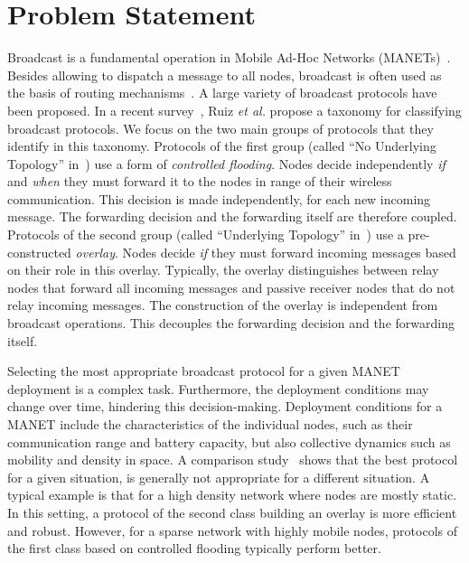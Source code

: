 
\section{Problem Statement}

Broadcast is a fundamental operation in Mobile Ad-Hoc Networks (MANETs)~\cite{SurveyRuiz}.
%
Besides allowing to dispatch a message to all nodes, broadcast is often used as the basis of routing mechanisms~\cite{survey_routing}.
%
A large variety of broadcast protocols have been proposed.
%
In a recent survey~\cite{SurveyRuiz}, Ruiz \emph{et al.} propose a taxonomy for classifying broadcast protocols.
%
We focus on the two main groups of protocols that they identify in this taxonomy.
%
Protocols of the first group (called ``No Underlying Topology'' in~\cite{SurveyRuiz}) use a form of \emph{controlled flooding}.
Nodes decide independently \emph{if} and \emph{when} they must forward it to the nodes in range of their wireless communication.
This decision is made independently, for each new incoming message.
The forwarding decision and the forwarding itself are therefore coupled.
%
Protocols of the second group (called ``Underlying Topology'' in~\cite{SurveyRuiz}) use a pre-constructed \emph{overlay}.
Nodes decide \emph{if} they must forward incoming messages based on their role in this overlay.
Typically, the overlay distinguishes between relay nodes that forward all incoming messages and passive receiver nodes that do not relay incoming messages.
The construction of the overlay is independent from broadcast operations.
This decouples the forwarding decision and the forwarding itself.

Selecting the most appropriate broadcast protocol for a given MANET deployment is a complex task.
Furthermore, the deployment conditions may change over time, hindering this decision-making.
Deployment conditions for a MANET include the characteristics of the individual nodes, such as their communication range and battery capacity, but also collective dynamics such as mobility and density in space.
A comparison study~\cite{DensityMobDrivenEval} shows that the best protocol for a given situation, is generally not appropriate for a different situation.
A typical example is that for a high density network where nodes are mostly static.
In this setting, a protocol of the second class building an overlay is more efficient and robust.
However, for a sparse network with highly mobile nodes, protocols of the first class based on controlled flooding typically perform better.

